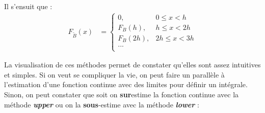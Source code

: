 \documentclass[10pt, french]{article}
\begin{document}
\begin{multicols*}{2}
\begin{definitionNOHFILLsub}
\bigskip

Il s'ensuit que :
\begin{align*}
	F_{\tilde{B}}(x)
	&=	\begin{cases}
		0,	&	0	\leq	x	<	h	\\
		F_{B}(h),	&	h	\leq	x	<	2h	\\
		F_{B}(2h),	&	2h	\leq	x	<	3h	\\
		...	&	\\
		\end{cases}
\end{align*}
\end{definitionNOHFILLsub}

La visualisation de ces méthodes permet de constater qu'elles sont assez intuitives et simples. Si on veut se compliquer la vie, on peut faire un parallèle à l'estimation d'une fonction continue avec des limites pour définir un intégrale. Sinon, on peut constater que soit on \textbf{sur}estime la fonction continue avec la méthode \og \textit{\textbf{upper}} \fg{} ou on la \textbf{sous}-estime avec la méthode \og \textit{\textbf{lower}} \fg{} :
\begin{center}
\begin{tikzpicture}[x=0.75pt,y=0.75pt,yscale=-1,xscale=1]


\end{tikzpicture}
\end{center}
\end{multicols*}
\end{document}
